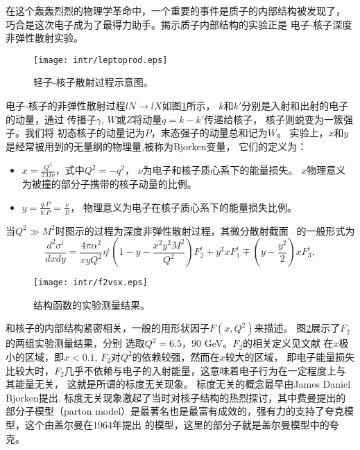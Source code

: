 在这个轰轰烈烈的物理学革命中，一个重要的事件是质子的内部结构被发现了，
巧合是这次电子成为了最得力助手。揭示质子内部结构的实验正是
电子-核子深度非弹性散射实验。
\begin{figure}[htpb]
    \centering
    \texttt{[image: intr/leptoprod.eps]}
    \caption{轻子-核子散射过程示意图。}%
    \label{fig:leptoprod}
\end{figure}
电子-核子的非弹性散射过程$l N \to l X$如图\ref{fig:leptoprod}所示，
$k$和$k'$分别是入射和出射的电子的动量，通过
传播子$\gamma$, $W$或$Z$将动量$q=k-k'$传递给核子，
核子则蜕变为一簇强子。我们将
初态核子的动量记为$P$，末态强子的动量总和记为$W$。
实验上，$x$和$y$是经常被用到的无量纲的物理量,被称为Bjorken变量，
它们的定义为：
\begin{itemize}
    \item $x= \frac{Q^{2} }{2 M \nu}$，式中$Q^2 = - q^2$，
        $\nu$为电子和核子质心系下的能量损失。
        $x$物理意义为被撞的部分子携带的核子动量的比例。
    \item $y = \frac{q.P}{k.P} = \frac{\nu}{E}$，
        物理意义为电子在核子质心系下的能量损失比例。
\end{itemize}
    当$Q^{2} \gg M^{2}$时图示的过程为深度非弹性散射过程，其微分散射截面~\cite{Blumlein:1996vs,Forte:2001ph,Anselmino:1993tc}
的一般形式为
\begin{equation}
\frac{d^2 \sigma^i} {dx dy} 
    = \frac{4 \pi \alpha^2}{xy Q^2} \eta^{i}
    {(1-y - \frac{x^2 y^2 M^2}{Q^2}) F_{2}^{i}
+ y^2 x F_{1}^{i} \mp (y- \frac{y^2}{2}) x F_{3}^{i}
},
\end{equation}
\begin{figure}[htpb]
    \centering
    \texttt{[image: intr/f2vsx.eps]}
    \caption{结构函数的实验测量结果。}%
    \label{fig:f2vsx}
\end{figure}
和核子的内部结构紧密相关，一般的用形状因子$F(x, Q^2)$来描述。
图\ref{fig:f2vsx}展示了$F_{2}$的两组实验测量结果，分别
选取$Q^{2}=6.5，90$ GeV。$F_2$的相关定义见文献\cite{Klein:1983vs}
在$x$极小的区域，即$x<0.1$, $F_{2}$对$Q^2$的依赖较强，然而在$x$较大的区域，
即电子能量损失比较大时，$F_2$几乎不依赖与电子的入射能量，这意味着电子行为在一定程度上与其能量无关，
这就是所谓的标度无关现象。
标度无关的概念最早由James Daniel Bjorken提出\cite{Bjorken:1968dy}.
标度无关现象激起了当时对核子结构的热烈探讨，其中费曼提出的部分子模型（parton
model）是最著名也是最富有成效的，强有力的支持了夸克模型，这个由盖尔曼在1964年提出
的模型，这里的部分子就是盖尔曼模型中的夸克\cite{Greenberg:1981zv}。

